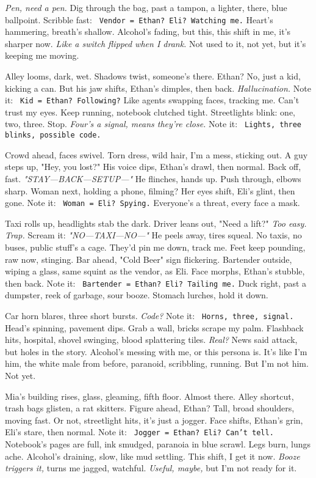 \documentclass[12pt]{article}
\newcommand{\note}[1]{\texttt{\small \color{DarkGray} #1}}
\begin{document}
\textit{Pen, need a pen.} Dig through the bag, past a tampon, a lighter, there, blue ballpoint. Scribble fast: \note{Vendor = Ethan? Eli? Watching me.} Heart’s hammering, breath’s shallow. Alcohol’s fading, but this, this shift in me, it’s sharper now. \textit{Like a switch flipped when I drank.} Not used to it, not yet, but it’s keeping me moving.

Alley looms, dark, wet. Shadows twist, someone’s there. \textnormal{Ethan}? No, just a kid, kicking a can. But his jaw shifts, \textnormal{Ethan}’s dimples, then back. \textit{Hallucination.} Note it: \note{Kid = Ethan? Following?} Like agents swapping faces, tracking me. Can’t trust my eyes. Keep running, notebook clutched tight. Streetlights blink: one, two, three. Stop. \textit{Four’s a signal, means they’re close.} Note it: \note{Lights, three blinks, possible code.}

Crowd ahead, faces swivel. Torn dress, wild hair, I’m a mess, sticking out. A guy steps up, "Hey, you lost?" His voice dips, \textnormal{Ethan}’s drawl, then normal. Back off, fast. \textit{"STAY—BACK—SETUP—"} He flinches, hands up. Push through, elbows sharp. Woman next, holding a phone, filming? Her eyes shift, \textnormal{Eli}’s glint, then gone. Note it: \note{Woman = Eli? Spying.} Everyone’s a threat, every face a mask.

Taxi rolls up, headlights stab the dark. Driver leans out, "Need a lift?" \textit{Too easy. Trap.} Scream it: \textit{"NO—TAXI—NO—"} He peels away, tires squeal. No taxis, no buses, public stuff’s a cage. They’d pin me down, track me. Feet keep pounding, raw now, stinging. Bar ahead, "Cold Beer" sign flickering. Bartender outside, wiping a glass, same squint as the vendor, as \textnormal{Eli}. Face morphs, \textnormal{Ethan}’s stubble, then back. Note it: \note{Bartender = Ethan? Eli? Tailing me.} Duck right, past a dumpster, reek of garbage, sour booze. Stomach lurches, hold it down.

Car horn blares, three short bursts. \textit{Code?} Note it: \note{Horns, three, signal.} Head’s spinning, pavement dips. Grab a wall, bricks scrape my palm. Flashback hits, hospital, shovel swinging, blood splattering tiles. \textit{Real?} News said attack, but holes in the story. Alcohol’s messing with me, or this persona is. It’s like I’m him, the white male from before, paranoid, scribbling, running. But I’m not him. Not yet.

\textnormal{Mia}’s building rises, glass, gleaming, fifth floor. Almost there. Alley shortcut, trash bags glisten, a rat skitters. Figure ahead, \textnormal{Ethan}? Tall, broad shoulders, moving fast. Or not, streetlight hits, it’s just a jogger. Face shifts, \textnormal{Ethan}’s grin, \textnormal{Eli}’s stare, then normal. Note it: \note{Jogger = Ethan? Eli? Can’t tell.} Notebook’s pages are full, ink smudged, paranoia in blue scrawl. Legs burn, lungs ache. Alcohol’s draining, slow, like mud settling. This shift, I get it now. \textit{Booze triggers it,} turns me jagged, watchful. \textit{Useful, maybe,} but I’m not ready for it.
\end{document}
